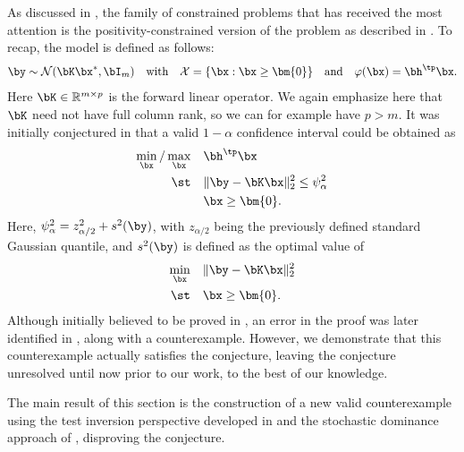 \documentclass[11pt]{article}
\numberwithin{equation}{section}
\numberwithin{figure}{section}
\begin{document}
As discussed in , the family of constrained problems that has received the most attention is the positivity-constrained version of the problem as described in . 
To recap, the model is defined as follows:
\begin{equation}\label{eq:BurrusConjectureModel} 
\by \sim \mathcal{N}(\bK \bx^*, \bI_m) \quad \text{with} \quad \mathcal{X} = \{\bx: \bx \geq \bm{0}\} \quad \text{and} \quad \varphi(\bx) = \bh^\tp \bx.
\end{equation}
Here $\bK \in \mathbb{R}^{m \times p}$ is the forward linear operator.
We again emphasize here that $\bK$ need not have full column rank, so we can for example have $p > m$.
It was initially conjectured in \cite{burrus1965utilization,rust_burrus} that a valid $1-\alpha$ confidence interval could be obtained as
\begin{equation}\label{opt4burrus}
\begin{aligned}
\min_{\bx}/\max_{\bx} \quad & \bh^\tp\bx \\
\st \quad & \Vert \by - \bK\bx \Vert_2^2 \leq \psi^2_\alpha\\
  \quad & \bx \geq \bm{0}.
\end{aligned}
\end{equation}
Here, $\psi^2_\alpha = z_{\alpha/2}^2 + s^2(\by)$, with $z_{\alpha/2}$ being the previously defined standard Gaussian quantile, and $s^2(\by)$ is defined as the optimal value of
\begin{equation*}
\begin{aligned}
\min_{\bx} \quad & \Vert \by - \bK\bx\Vert^2_2 \\ 
\st \quad & \bx \geq \bm{0}.
\end{aligned}
\end{equation*}
Although initially believed to be proved in \cite{rust1994confidence}, an error in the proof was later identified in \cite{tenorio2007confidence}, along with a counterexample. 
However, we demonstrate that this counterexample actually satisfies the conjecture, leaving the conjecture unresolved until now prior to our work, to the best of our knowledge.

The main result of this section is the construction of a new valid counterexample using the test inversion perspective developed in  and the stochastic dominance approach of , disproving the conjecture. 
\end{document}
